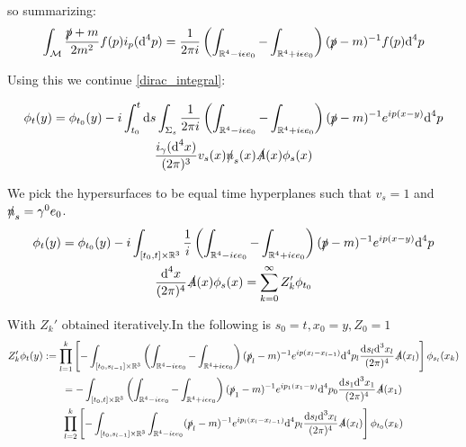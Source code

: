\documentclass[a4paper,12pt]{article}
\begin{document}
so summarizing:
\begin{equation}
\int_{\mathcal{M}}\frac{\slashed{p}+m}{2 m^2} f(p) i_p(\text{d}^4p)=\frac{1}{2\pi i}   \left( \int_{\mathbb{R}^4-i \epsilon e_0}-\int_{\mathbb{R}^4+i \epsilon e_0} \right) (\slashed{p}-m)^{-1} f(p)  \text{d}^4p
\end{equation}


Using this we continue \eqref{dirac_integral}:

\begin{multline}
\phi_t(y)=\phi_{t_0}(y)
-i \int_{t_0}^t \text{d}s \int_{\Sigma_s}\frac{1}{2\pi i}   \left( \int_{\mathbb{R}^4-i \epsilon e_0}-\int_{\mathbb{R}^4+i \epsilon e_0} \right) (\slashed{p}-m)^{-1} e^{ip(x-y)}  \text{d}^4p \\
 \frac{i_{\gamma}(\text{d}^4x)}{(2\pi)^{3}}v_s(x)\slashed{n}_s(x) \slashed{A}(x)\phi_s(x)\\
\end{multline} 

 We pick the hypersurfaces to be equal time hyperplanes such that \(v_s=1\) and \(\slashed{n}_s=\gamma^0 e_0\).
\begin{multline}
\phi_t(y)=\phi_{t_0}(y)
-i \int_{[t_0,t]\times\mathbb{R}^3}\frac{1}{i}   \left( \int_{\mathbb{R}^4-i \epsilon e_0}-\int_{\mathbb{R}^4+i \epsilon e_0} \right) (\slashed{p}-m)^{-1} e^{ip(x-y)}  \text{d}^4p \\
 \frac{\text{d}^4x}{(2\pi)^{4}}\slashed{A}(x)\phi_s(x)=\sum_{k=0}^\infty Z_k' \phi_{t_0}\\
\end{multline} 


With \(Z_k'\) obtained iteratively.In the following is \(s_0=t, x_0=y, Z_0=1\)
\begin{multline}\label{preliminary_z_k}
Z_k'\phi_{t}(y):=\prod_{l=1}^k \left[- \int_{[t_0,s_{l-1}]\times\mathbb{R}^3} \left( \int_{\mathbb{R}^4-i \epsilon e_0}-\int_{\mathbb{R}^4+i \epsilon e_0} \right) (\slashed{p}_l-m)^{-1} e^{ip(x_l-x_{l-1})}  \text{d}^4p_l 
 \frac{\text{d}s_l\text{d}^3x_l}{(2\pi)^{4}}\slashed{A}(x_l)\right]\phi_{s_l}(x_k)\\
=- \int_{[t_0,t]\times\mathbb{R}^3} \left( \int_{\mathbb{R}^4-i \epsilon e_0}-\int_{\mathbb{R}^4+i \epsilon e_0} \right) (\slashed{p}_1-m)^{-1} e^{ip_1(x_1-y)}  \text{d}^4p_0 
 \frac{\text{d}s_1\text{d}^3x_1}{(2\pi)^{4}}\slashed{A}(x_1)\\
  \prod_{l=2}^k \left[- \int_{[t_0,s_{l-1}]\times\mathbb{R}^3} \int_{\mathbb{R}^4-i \epsilon e_0} (\slashed{p}_l-m)^{-1} e^{ip_l(x_l-x_{l-1})}  \text{d}^4p_l 
 \frac{\text{d}s_l\text{d}^3x_l}{(2\pi)^{4}}\slashed{A}(x_l)\right]\phi_{t_0}(x_k)
\end{multline}
\end{document}
